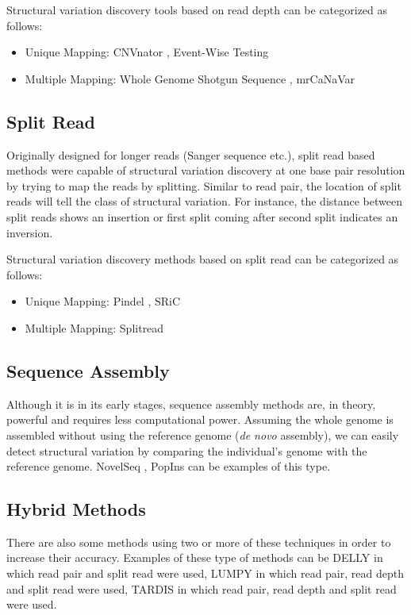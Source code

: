 Structural variation discovery tools based on read depth can be categorized as follows:
\begin{itemize}
    \item Unique Mapping: CNVnator \cite{abyzov2011cnvnator}, Event-Wise Testing \cite{yoon2009sensitive}
    \item Multiple Mapping: Whole Genome Shotgun Sequence \cite{bailey2002recent}, mrCaNaVar \cite{alkan2009personalized}
\end{itemize}

\subsection{Split Read}
Originally designed for longer reads (Sanger sequence etc.), split read based methods were capable of structural variation discovery at one base pair resolution by trying to map the reads by splitting. Similar to read pair, the location of split reads will tell the class of structural variation. For instance, the distance between split reads shows an insertion or first split coming after second split indicates an inversion.

Structural variation discovery methods based on split read can be categorized as follows:
\begin{itemize}
    \item Unique Mapping: Pindel \cite{ye2009pindel}, SRiC \cite{zhang2011identification}
    \item Multiple Mapping: Splitread \cite{karakoc2012detection}
\end{itemize}

\subsection{Sequence Assembly} 
Although it is in its early stages, sequence assembly methods are, in theory, powerful and requires less computational power. Assuming the whole genome is assembled without using the reference genome (\textit{de novo} assembly), we can easily detect structural variation by comparing the individual's genome with the reference genome. NovelSeq \cite{hajirasouliha2010detection}, PopIns \cite{kehr2015popins} can be examples of this type.

\subsection{Hybrid Methods}
There are also some methods using two or more of these techniques in order to increase their accuracy. Examples of these type of methods can be DELLY \cite{rausch2012delly} in which read pair and split read were used, LUMPY \cite{layer2014lumpy} in which read pair, read depth and split read were used, TARDIS \cite{soylev2017toolkit} in which read pair, read depth and split read were used. 

